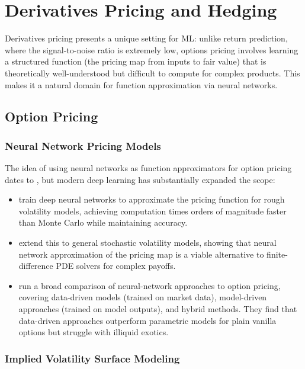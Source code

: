 \section{Derivatives Pricing and Hedging}\label{sec:derivatives}

Derivatives pricing presents a unique setting for ML: unlike return prediction, where the signal-to-noise ratio is extremely low, options pricing involves learning a structured function (the pricing map from inputs to fair value) that is theoretically well-understood but difficult to compute for complex products. This makes it a natural domain for function approximation via neural networks.

\subsection{Option Pricing}

\subsubsection{Neural Network Pricing Models}

The idea of using neural networks as function approximators for option pricing dates to \citet{Hutchinson1994}, but modern deep learning has substantially expanded the scope:

\begin{itemize}[leftmargin=*]
    \item \citet{Bayer2019} train deep neural networks to approximate the pricing function for rough volatility models, achieving computation times orders of magnitude faster than Monte Carlo while maintaining accuracy.

    \item \citet{Horvath2021} extend this to general stochastic volatility models, showing that neural network approximation of the pricing map is a viable alternative to finite-difference PDE solvers for complex payoffs.

    \item \citet{Ruf2020} run a broad comparison of neural-network approaches to option pricing, covering data-driven models (trained on market data), model-driven approaches (trained on model outputs), and hybrid methods. They find that data-driven approaches outperform parametric models for plain vanilla options but struggle with illiquid exotics.
\end{itemize}

\subsubsection{Implied Volatility Surface Modeling}

